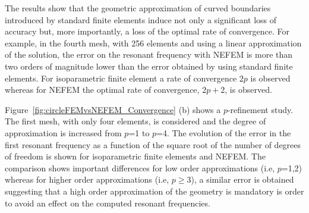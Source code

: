 The results show that the geometric approximation of curved boundaries introduced by standard finite elements induce not only a significant loss of accuracy but, more importantly, a loss of the optimal rate of convergence. For example, in the fourth mesh, with 256 elements and using a linear approximation of the solution, the error on the resonant frequency with NEFEM is more than two orders of magnitude lower than the error obtained by using standard finite elements. For isoparametric finite element a rate of convergence $2p$ is observed whereas for NEFEM the optimal rate of convergence, $2p+2$, is observed. 

Figure~\ref{fig:circleFEMvsNEFEM_Convergence} (b) shows a $p$-refinement study. The first mesh, with only four elements, is considered and the degree of approximation is increased from $p$=1 to $p$=4. The evolution of the error in the first resonant frequency as a function of the square root of the number of degrees of freedom is shown for isoparametric finite elements and NEFEM. The comparison shows important differences for low order approximations (i.e, $p$=1,2) whereas for higher order approximations (i.e, $p \geq$3), a similar error is obtained suggesting that a high order approximation of the geometry is mandatory is order to avoid an effect on the computed resonant frequencies. 

